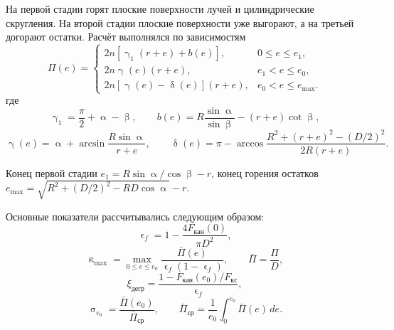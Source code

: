 \documentclass[a4paper,12pt]{article}
\renewcommand{\alpha}{\upalpha}
\renewcommand{\beta}{\upbeta}
\renewcommand{\gamma}{\upgamma}
\renewcommand{\delta}{\updelta}
\renewcommand{\varepsilon}{\upvarepsilon}
\renewcommand{\sigma}{\upsigma}
\renewcommand{\kappa}{\upkappa}
\begin{document}
        На первой стадии горят плоские поверхности лучей и цилиндрические скругления. На второй стадии плоские поверхности уже выгорают, а на третьей догорают остатки. Расчёт выполнялся по зависимостям
        \begin{equation}
        \Pi(e)=\begin{cases}
        2n\left[\gamma_1(r+e)+b(e)\right],&0\le e\le e_1,\\
        2n\gamma(e)(r+e),&e_1<e\le e_0,\\
        2n[\gamma(e)-\delta(e)](r+e),&e_0<e\le e_{\max}.
        \end{cases}
        \tag{4}
        \end{equation}
        где
        \begin{equation}
        \gamma_1=\frac{\pi}{2}+\alpha-\beta,\qquad
        b(e)=R\frac{\sin\alpha}{\sin\beta}-(r+e)\cot\beta,
        \tag{5}
        \end{equation}
        \begin{equation}
        \gamma(e)=\alpha+\arcsin\frac{R\sin\alpha}{r+e},\qquad
        \delta(e)=\pi-\arccos\frac{R^2+(r+e)^2-(D/2)^2}{2R(r+e)}.
        \tag{6}
        \end{equation}

        \clearpage
        Конец первой стадии $e_1=R\sin\alpha/\cos\beta-r$, конец горения остатков
        $e_{\max}=\sqrt{R^2+(D/2)^2-RD\cos\alpha}-r$.

        Основные показатели рассчитывались следующим образом:
        \begin{equation}
          \varepsilon_f=1-\frac{4F_{\mathrm{кан}}(0)}{\pi D^2},
          \tag{7}
        \end{equation}
        \begin{equation}
          \bar\kappa_{\max}=\max_{0\le e\le e_0}
          \frac{\bar\Pi(e)}{\varepsilon_f(1-\varepsilon_f)},\qquad
          \bar\Pi=\frac{\Pi}{D},
          \tag{8}
        \end{equation}
        \begin{equation}
          \xi_{\mathrm{дегр}}=\frac{1-F_{\mathrm{кан}}(e_0)/F_{\mathrm{кс}}}{\varepsilon_f},
          \tag{9}
        \end{equation}
        \begin{equation}
          \sigma_{e_0}=\frac{\bar\Pi(e_0)}{\bar\Pi_{\mathrm{ср}}},\qquad
          \bar\Pi_{\mathrm{ср}}=\frac{1}{e_0}\int_0^{e_0}\bar\Pi(e)\,de.
          \tag{10}
        \end{equation}
\end{document}
